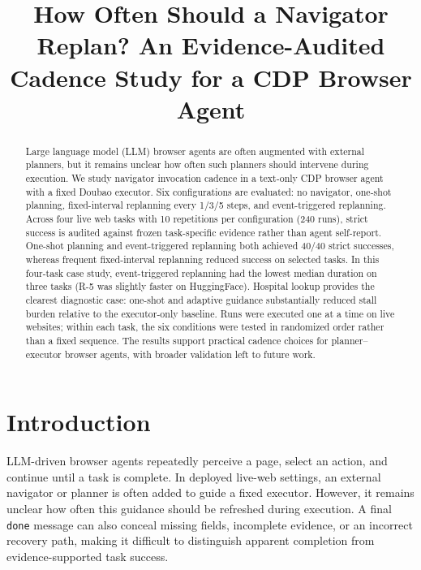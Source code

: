 \documentclass{llncs}
\begin{document}
\title{How Often Should a Navigator Replan? An Evidence-Audited Cadence Study for a CDP Browser Agent}

\author{}
\institute{}




\maketitle

\begin{abstract}
Large language model (LLM) browser agents are often augmented with external
planners, but it remains unclear how often such planners should intervene during
execution. We study navigator invocation cadence in a text-only CDP browser
agent with a fixed Doubao executor. Six configurations are evaluated: no
navigator, one-shot planning, fixed-interval replanning every 1/3/5 steps, and
event-triggered replanning. Across four live web tasks with 10 repetitions per
configuration (240 runs), strict success is audited against frozen task-specific
evidence rather than agent self-report. One-shot planning and event-triggered
replanning both achieved 40/40 strict successes, whereas frequent
fixed-interval replanning reduced success on selected tasks. In this four-task
case study, event-triggered replanning had the lowest median duration on three
tasks (R-5 was slightly faster on HuggingFace). Hospital lookup provides the
clearest diagnostic case: one-shot and adaptive guidance substantially reduced
stall burden relative to the executor-only baseline. Runs were executed one at a time on live websites; within each task, the six conditions were tested in randomized order rather than a fixed sequence. The results support practical cadence choices for planner--executor browser agents, with broader validation left to future work.
\end{abstract}

\section{Introduction}

LLM-driven browser agents repeatedly perceive a page, select an action, and
continue until a task is complete. In deployed live-web settings, an external
navigator or planner is often added to guide a fixed executor. However, it
remains unclear how often this guidance should be refreshed during execution.
A final \texttt{done} message can also conceal missing fields, incomplete
evidence, or an incorrect recovery path, making it difficult to distinguish
apparent completion from evidence-supported task success.
\end{document}
